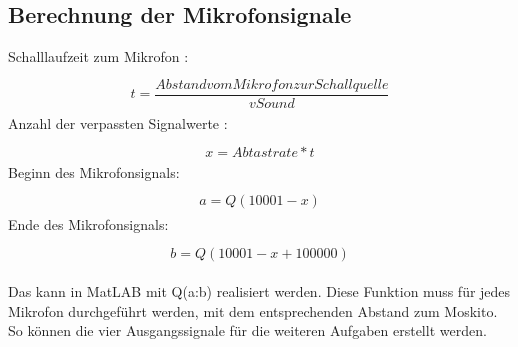 \subsection{Berechnung der Mikrofonsignale}
Schalllaufzeit zum Mikrofon :
\begin{align}
\begin{split}
\\ t = \dfrac{Abstand vom Mikrofon zur Schallquelle}{vSound}
\end{split}
\end{align}
Anzahl der verpassten Signalwerte :
\begin{align}
\begin{split}
\\ x = Abtastrate * t
\end{split}
\end{align}
Beginn des Mikrofonsignals:
\begin{align}
\begin{split}
\\ a = Q(10001 - x)
\end{split}
\end{align}
Ende des Mikrofonsignals:
\begin{align}
\begin{split}
 \\b = Q(10001 - x + 100000)
\end{split}
\end{align}

Das kann in MatLAB mit Q(a:b) realisiert werden.
Diese Funktion muss für jedes Mikrofon durchgeführt werden, mit dem entsprechenden Abstand zum Moskito.
So können die vier Ausgangssignale für die weiteren Aufgaben erstellt werden.